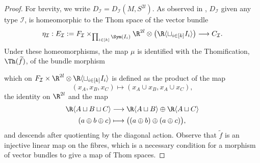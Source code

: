 \begin{proof}
   For brevity, we write $D_{\mathcal{I}}=D_{\mathcal{I}}(M,S^{2l})$. As observed in \cite{BodigheimerRationalCohoConfSpacesSurfaces}, $D_{\mathcal{I}}$ given any type $\mathcal{I}$,   is homeomorphic to the Thom space of the vector bundle
    \begin{equation*}
         \eta_{\mathcal{I}}:E_{\mathcal{I}}:= F_{\mathcal{I}}\times_{\prod_{i\in [k]}\Sym(I_i)}\R^{2l}\otimes \left(\R\langle \sqcup_{i\in [k]}I_i\rangle\right) \longrightarrow
            C_{\mathcal{I}}. 
    \end{equation*}
    Under these homeomorphisms, the map $\mu$ is identified with the Thomification, $\Th(\widetilde{f})$, of the bundle morphism
    \begin{center}
    \end{center}
    which on $F_{\mathcal{I}}\times \R^{2l}\otimes \R\langle \sqcup_{i\in [k]}I_i\rangle$ is defined as the product of the map
    $$(x_A,x_B,x_C)\longmapsto (x_A \cup x_B,x_A \cup x_C),$$
    the identity on $\R^{2l}$ and the map
    \begin{align*}
        \R\langle A\sqcup B \sqcup C\rangle&\longrightarrow \R\langle A\sqcup B\rangle\oplus \R\langle A\sqcup C\rangle\\
        (a\oplus b\oplus c)&\longmapsto  \big((a\oplus b)\oplus (a\oplus c)\big),
    \end{align*}
    and descends after quotienting by the diagonal action. 
    Observe that $\widetilde{f}$ is an injective linear map on the fibres, which is a necessary condition for a morphism of vector bundles to give a map of Thom spaces. 


\end{proof}
